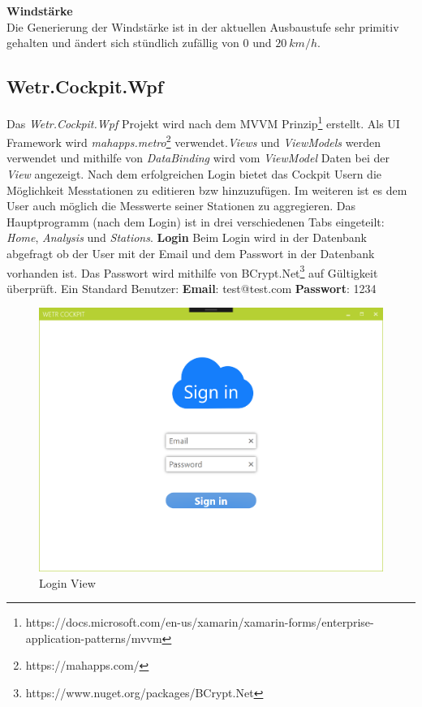 \textbf{Windstärke}\\
Die Generierung der Windstärke ist in der aktuellen Ausbaustufe sehr primitiv gehalten und ändert sich stündlich zufällig von $0$ und $20\ km/h$.


\newpage
\subsection{Wetr.Cockpit.Wpf}
Das \textit{Wetr.Cockpit.Wpf} Projekt wird nach dem MVVM Prinzip\footnote{https://docs.microsoft.com/en-us/xamarin/xamarin-forms/enterprise-application-patterns/mvvm} erstellt. Als UI Framework wird \textit{mahapps.metro}\footnote{https://mahapps.com/} verwendet.\textit{Views} und \textit{ViewModels} werden verwendet und mithilfe von \textit{DataBinding} wird vom \textit{ViewModel} Daten bei der \textit{View} angezeigt. Nach dem erfolgreichen Login bietet das Cockpit Usern die Möglichkeit Messtationen zu editieren bzw hinzuzufügen. Im weiteren ist es dem User auch möglich die Messwerte seiner Stationen zu aggregieren.
\newline
\newline
Das Hauptprogramm (nach dem Login) ist in drei verschiedenen Tabs eingeteilt: \newline\textit{Home}, \textit{Analysis} und \textit{Stations}.
\newline
\newline
\textbf{Login}\newline
Beim Login wird in der Datenbank abgefragt ob der User mit der Email und dem Passwort in der Datenbank vorhanden ist. Das Passwort wird mithilfe von BCrypt.Net\footnote{https://www.nuget.org/packages/BCrypt.Net} auf Gültigkeit überprüft. \newline\newline
Ein Standard Benutzer:\newline
\textbf{Email}: test@test.com\newline
\textbf{Passwort}: 1234

\begin{figure}[H]
\centering
\includegraphics[width=.7\textwidth]{pictures/Cockpit/Cockpit_1.png}
\caption{Login View}
\label{fig:Wetr.Cockpit.Wpf.LoginView}
\end{figure}
\raggedright

